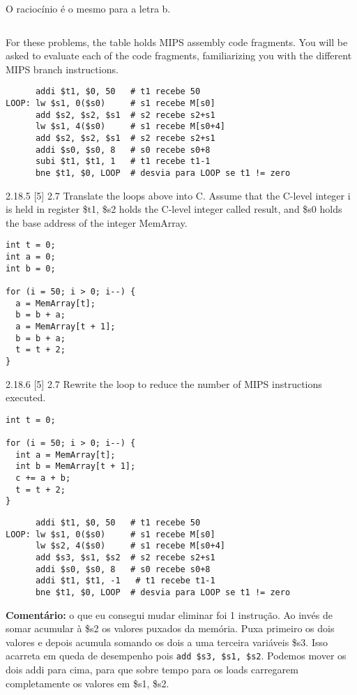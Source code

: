 \documentclass{article}
\begin{document}
O raciocínio é o mesmo para a letra b.

\begin{verbatim}

\end{verbatim}

For these problems, the table holds MIPS assembly code fragments. You will be
asked to evaluate each of the code fragments, familiarizing you with the 
different MIPS branch instructions.

\begin{verbatim}
      addi $t1, $0, 50   # t1 recebe 50
LOOP: lw $s1, 0($s0)     # s1 recebe M[s0]
      add $s2, $s2, $s1  # s2 recebe s2+s1
      lw $s1, 4($s0)     # s1 recebe M[s0+4]
      add $s2, $s2, $s1  # s2 recebe s2+s1
      addi $s0, $s0, 8   # s0 recebe s0+8
      subi $t1, $t1, 1   # t1 recebe t1-1
      bne $t1, $0, LOOP  # desvia para LOOP se t1 != zero
\end{verbatim}

2.18.5 [5] 2.7 Translate the loops above into C. Assume that the C-level 
integer i is held in register \$t1, \$s2 holds the C-level integer called 
result, and \$s0 holds the base address of the integer MemArray.

\begin{verbatim}
int t = 0;
int a = 0;
int b = 0;

for (i = 50; i > 0; i--) {
  a = MemArray[t];
  b = b + a;
  a = MemArray[t + 1];
  b = b + a;
  t = t + 2;
}
\end{verbatim}

2.18.6  [5] 2.7 Rewrite the loop to reduce the number of MIPS instructions
executed.

\begin{verbatim}
int t = 0;

for (i = 50; i > 0; i--) {
  int a = MemArray[t];
  int b = MemArray[t + 1];
  c += a + b;
  t = t + 2;
}
\end{verbatim}

\begin{verbatim}
      addi $t1, $0, 50   # t1 recebe 50
LOOP: lw $s1, 0($s0)     # s1 recebe M[s0]
      lw $s2, 4($s0)     # s1 recebe M[s0+4]
      add $s3, $s1, $s2  # s2 recebe s2+s1
      addi $s0, $s0, 8   # s0 recebe s0+8
      addi $t1, $t1, -1   # t1 recebe t1-1
      bne $t1, $0, LOOP  # desvia para LOOP se t1 != zero
\end{verbatim}

\textbf{Comentário: } o que eu consegui mudar eliminar foi 1 instrução. Ao 
invés de somar acumular à \$s2 os valores puxados da memória. Puxa primeiro os 
dois valores e depois acumula somando os dois a uma terceira variáveis \$s3. 
Isso acarreta em queda de desempenho pois \verb|add $s3, $s1, $s2|. Podemos 
mover os dois addi para cima, para que sobre tempo para os loads carregarem 
completamente os valores em \$s1, \$s2.
\end{document}
